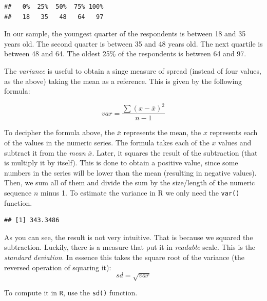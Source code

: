 \documentclass[
]{book}
\newenvironment{Shaded}{\begin{snugshade}}{\end{snugshade}}
\newcommand{\AttributeTok}[1]{\textcolor[rgb]{0.13,0.29,0.53}{#1}}
\newcommand{\FunctionTok}[1]{\textcolor[rgb]{0.13,0.29,0.53}{\textbf{#1}}}
\newcommand{\NormalTok}[1]{#1}
\newcommand{\SpecialCharTok}[1]{\textcolor[rgb]{0.81,0.36,0.00}{\textbf{#1}}}
\begin{document}
\begin{verbatim}
##   0%  25%  50%  75% 100% 
##   18   35   48   64   97
\end{verbatim}

In our sample, the youngest quarter of the respondents is between 18 and 35 years old. The second quarter is between 35 and 48 years old. The next quartile is between 48 and 64. The oldest 25\% of the respondents is between 64 and 97.

The \emph{variance} is useful to obtain a singe measure of spread (instead of four values, as the above) taking the mean as a reference. This is given by the following formula:

\[ var = \frac{ \sum(x - \bar{x})^2 }{n-1 } \]

To decipher the formula above, the \(\bar{x}\) represents the mean, the \(x\) represents each of the values in the numeric series. The formula takes each of the \(x\) values and subtract it from the \emph{mean} \(\bar{x}\). Later, it squares the result of the subtraction (that is multiply it by itself). This is done to obtain a positive value, since some numbers in the series will be lower than the mean (resulting in negative values). Then, we sum all of them and divide the sum by the size/length of the numeric sequence \(n\) minus 1. To estimate the variance in R we only need the \texttt{var()} function.

\begin{Shaded}
\end{Shaded}

\begin{verbatim}
## [1] 343.3486
\end{verbatim}

As you can see, the result is not very intuitive. That is because we squared the subtraction. Luckily, there is a measure that put it in \emph{readable} scale. This is the \emph{standard deviation}. In essence this takes the square root of the variance (the reversed operation of squaring it):
\[sd=\sqrt{var}\]

To compute it in \texttt{R}, use the \texttt{sd()} function.

\begin{Shaded}
\end{Shaded}
\end{document}
